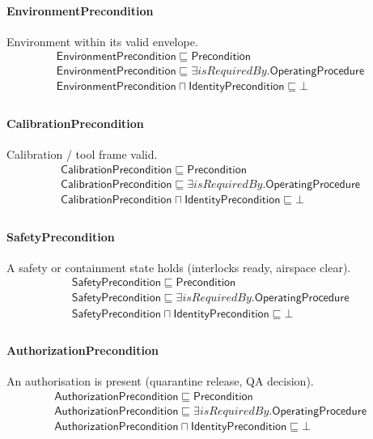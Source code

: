 \documentclass[10pt]{article}
\begin{document}
\paragraph{EnvironmentPrecondition} Environment within its valid envelope.
\[\begin{array}{l}
\mathsf{EnvironmentPrecondition} \sqsubseteq  \mathsf{Precondition} \\
\mathsf{EnvironmentPrecondition} \sqsubseteq  \exists \mathit{isRequiredBy}.\mathsf{OperatingProcedure} \\
\mathsf{EnvironmentPrecondition} \sqcap  \mathsf{IdentityPrecondition} \sqsubseteq  \bot  \\
\end{array}\]
\paragraph{CalibrationPrecondition} Calibration / tool frame valid.
\[\begin{array}{l}
\mathsf{CalibrationPrecondition} \sqsubseteq  \mathsf{Precondition} \\
\mathsf{CalibrationPrecondition} \sqsubseteq  \exists \mathit{isRequiredBy}.\mathsf{OperatingProcedure} \\
\mathsf{CalibrationPrecondition} \sqcap  \mathsf{IdentityPrecondition} \sqsubseteq  \bot  \\
\end{array}\]
\paragraph{SafetyPrecondition} A safety or containment state holds (interlocks ready, airspace clear).
\[\begin{array}{l}
\mathsf{SafetyPrecondition} \sqsubseteq  \mathsf{Precondition} \\
\mathsf{SafetyPrecondition} \sqsubseteq  \exists \mathit{isRequiredBy}.\mathsf{OperatingProcedure} \\
\mathsf{SafetyPrecondition} \sqcap  \mathsf{IdentityPrecondition} \sqsubseteq  \bot  \\
\end{array}\]
\paragraph{AuthorizationPrecondition} An authorisation is present (quarantine release, QA decision).
\[\begin{array}{l}
\mathsf{AuthorizationPrecondition} \sqsubseteq  \mathsf{Precondition} \\
\mathsf{AuthorizationPrecondition} \sqsubseteq  \exists \mathit{isRequiredBy}.\mathsf{OperatingProcedure} \\
\mathsf{AuthorizationPrecondition} \sqcap  \mathsf{IdentityPrecondition} \sqsubseteq  \bot  \\
\end{array}\]
\end{document}
